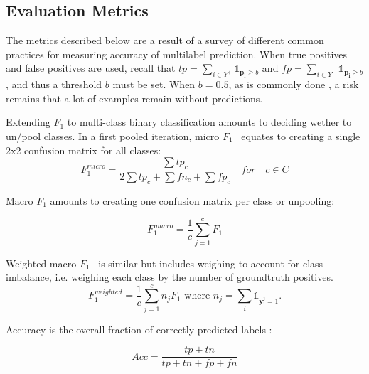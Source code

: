 


\subsection{Evaluation Metrics}
\label{sec:org23c8447}


The metrics described below are a result of a survey of different common practices for measuring accuracy of multilabel prediction. When true positives and false positives are used, recall that \(t p=\sum_{i \in Y^{+}} \mathds{1}_{\mathbf{p_i} \geq b}\) and \(f p=\sum_{i \in Y^{-}} \mathds{1}_{\mathbf{p_i} \geq b}\), and thus a threshold \(b\) must be set. When \(b = 0.5\), as is commonly done , a risk remains that a lot of examples remain without predictions.

Extending \(F_1\) to multi-class binary classification amounts to deciding wether to un/pool classes.
In a first pooled iteration, micro \(F_1\)~\cite{multilabelMetrics} equates to creating a single 2x2 confusion matrix for all classes:
$$F_1^{micro} = \frac{\sum tp_c}{2 \sum tp_c + \sum fn_c + \sum fp_c} \quad for \quad c \in C$$

Macro \(F_1\) \cite{threshForF1, multilabelMetrics} amounts to creating one confusion matrix per class or unpooling:

$$F_1^{macro} = \frac{1}{c} \sum_{j=1}^c F_1$$


Weighted macro \(F_1\)~\cite{weightedMetrics} is similar but includes weighing to account for class imbalance, i.e. weighing each class by the number of groundtruth positives.
\begin{equation}
F_1^{weighted} = \frac{1}{c} \sum_{j=1}^c n_j F_1 \text{ where } n_j = \sum_i \mathds{1}_{\mathbf{y_i^j} = 1}.
\end{equation}


Accuracy is the overall fraction of correctly predicted labels \cite{threshForF1}:

$$
A c c=\frac{\mathit{tp} + \mathit{tn}}{\mathit{tp} + \mathit{tn} + \mathit{fp} + \mathit{fn}}
$$

